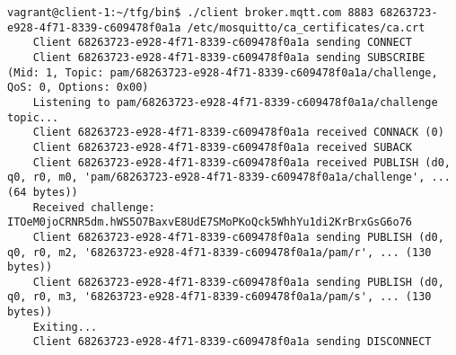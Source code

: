 \begin{lstlisting}[style=Consola, caption={Salida script cliente}, label={code:client-script}]
    vagrant@client-1:~/tfg/bin$ ./client broker.mqtt.com 8883 68263723-e928-4f71-8339-c609478f0a1a /etc/mosquitto/ca_certificates/ca.crt
    Client 68263723-e928-4f71-8339-c609478f0a1a sending CONNECT
    Client 68263723-e928-4f71-8339-c609478f0a1a sending SUBSCRIBE (Mid: 1, Topic: pam/68263723-e928-4f71-8339-c609478f0a1a/challenge, QoS: 0, Options: 0x00)
    Listening to pam/68263723-e928-4f71-8339-c609478f0a1a/challenge topic...
    Client 68263723-e928-4f71-8339-c609478f0a1a received CONNACK (0)
    Client 68263723-e928-4f71-8339-c609478f0a1a received SUBACK
    Client 68263723-e928-4f71-8339-c609478f0a1a received PUBLISH (d0, q0, r0, m0, 'pam/68263723-e928-4f71-8339-c609478f0a1a/challenge', ... (64 bytes))
    Received challenge: ITOeM0joCRNR5dm.hWS5O7BaxvE8UdE7SMoPKoQck5WhhYu1di2KrBrxGsG6o76
    Client 68263723-e928-4f71-8339-c609478f0a1a sending PUBLISH (d0, q0, r0, m2, '68263723-e928-4f71-8339-c609478f0a1a/pam/r', ... (130 bytes))
    Client 68263723-e928-4f71-8339-c609478f0a1a sending PUBLISH (d0, q0, r0, m3, '68263723-e928-4f71-8339-c609478f0a1a/pam/s', ... (130 bytes))
    Exiting...
    Client 68263723-e928-4f71-8339-c609478f0a1a sending DISCONNECT
\end{lstlisting}

